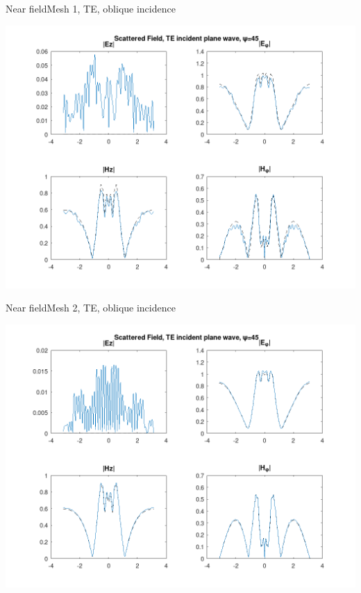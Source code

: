 
\begin{frame}{Near field}{Mesh 1, TE, oblique incidence}

\includegraphics[width=0.95\linewidth]{results/pec_y_malla_gorda_45_TE/NF.png}
  
\end{frame}
  

\begin{frame}{Near field}{Mesh 2, TE, oblique incidence}

\includegraphics[width=0.95\linewidth]{results/pec_y_malla_fina_45_TE/NF.png}
  
\end{frame}
  
